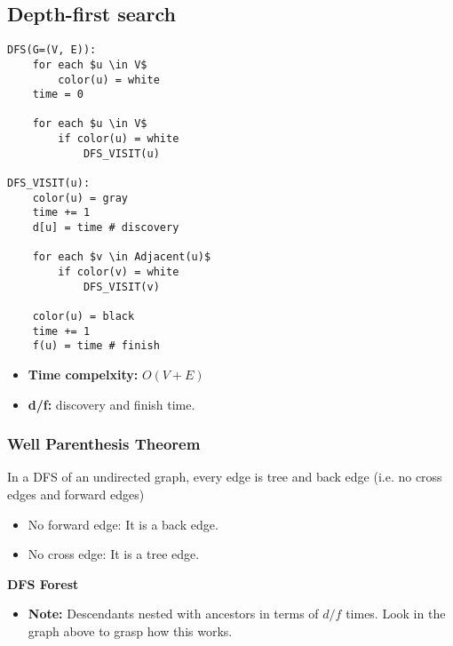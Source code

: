\subsection{Depth-first search}
\begin{definition}
\begin{lstlisting}[mathescape=true]
DFS(G=(V, E)):
    for each $u \in V$
        color(u) = white
    time = 0
    
    for each $u \in V$
        if color(u) = white
            DFS_VISIT(u)

DFS_VISIT(u):
    color(u) = gray
    time += 1
    d[u] = time # discovery
    
    for each $v \in Adjacent(u)$
        if color(v) = white
            DFS_VISIT(v)
    
    color(u) = black
    time += 1
    f(u) = time # finish
\end{lstlisting}
\begin{itemize}
    \item \textbf{Time compelxity:} $O(V+E)$
    \item \textbf{d/f:} discovery and finish time. 
\end{itemize}

\end{definition}

\subsubsection{Well Parenthesis Theorem}
\begin{theorem}
    In a DFS of an undirected graph, every edge is tree and back edge (i.e. no cross edges and forward edges)
    \begin{itemize}
        \item No forward edge: It is a back edge. 
        \item No cross edge: It is a tree edge.
    \end{itemize}
\end{theorem}

\begin{example}
    \vspace{1em}

    \textbf{DFS Forest}

    \vspace{1em}
    \begin{itemize}
        \item \textbf{Note:} Descendants nested with ancestors in terms of $d/f$ times. Look in the graph above to grasp how this works.
    \end{itemize}
\end{example}

